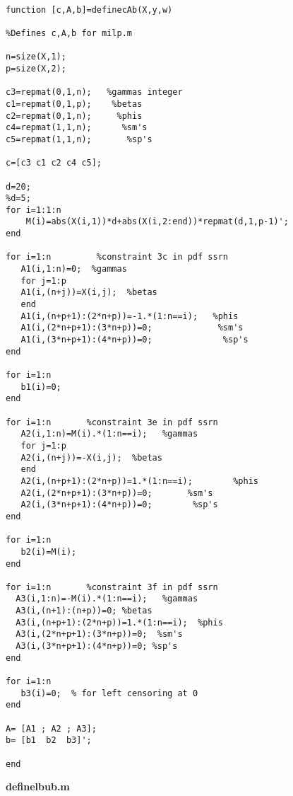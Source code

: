 \documentclass[12pt]{article}
\begin{document}
\begin{lstlisting}

function [c,A,b]=definecAb(X,y,w)

%Defines c,A,b for milp.m

n=size(X,1);
p=size(X,2);

c3=repmat(0,1,n);   %gammas integer
c1=repmat(0,1,p);    %betas
c2=repmat(0,1,n);     %phis
c4=repmat(1,1,n);      %sm's
c5=repmat(1,1,n);       %sp's

c=[c3 c1 c2 c4 c5];

d=20;
%d=5;
for i=1:1:n
    M(i)=abs(X(i,1))*d+abs(X(i,2:end))*repmat(d,1,p-1)';
end

for i=1:n         %constraint 3c in pdf ssrn
   A1(i,1:n)=0;  %gammas
   for j=1:p
   A1(i,(n+j))=X(i,j);  %betas
   end
   A1(i,(n+p+1):(2*n+p))=-1.*(1:n==i);   %phis
   A1(i,(2*n+p+1):(3*n+p))=0;             %sm's
   A1(i,(3*n+p+1):(4*n+p))=0;              %sp's
end

for i=1:n
   b1(i)=0;
end

for i=1:n       %constraint 3e in pdf ssrn
   A2(i,1:n)=M(i).*(1:n==i);   %gammas
   for j=1:p
   A2(i,(n+j))=-X(i,j);  %betas
   end
   A2(i,(n+p+1):(2*n+p))=1.*(1:n==i);        %phis
   A2(i,(2*n+p+1):(3*n+p))=0;       %sm's
   A2(i,(3*n+p+1):(4*n+p))=0;        %sp's
end

for i=1:n
   b2(i)=M(i);
end

for i=1:n       %constraint 3f in pdf ssrn
  A3(i,1:n)=-M(i).*(1:n==i);   %gammas
  A3(i,(n+1):(n+p))=0; %betas
  A3(i,(n+p+1):(2*n+p))=1.*(1:n==i);  %phis
  A3(i,(2*n+p+1):(3*n+p))=0;  %sm's
  A3(i,(3*n+p+1):(4*n+p))=0; %sp's
end

for i=1:n
   b3(i)=0;  % for left censoring at 0 
end

A= [A1 ; A2 ; A3];
b= [b1  b2  b3]';

end

\end{lstlisting}



\textbf{definelbub.m}
\end{document}
